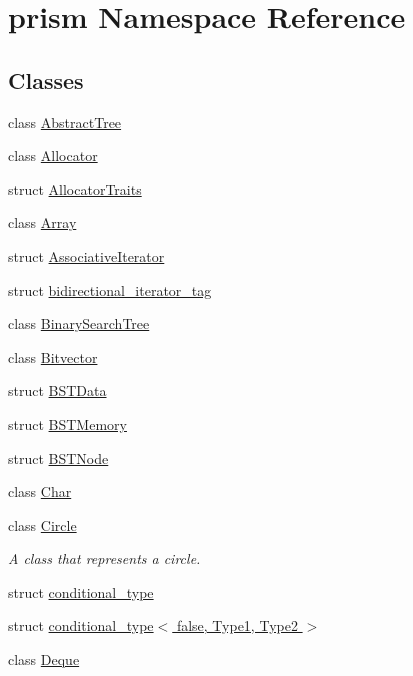 \hypertarget{namespaceprism}{}\section{prism Namespace Reference}
\label{namespaceprism}
\subsection*{Classes}
\begin{DoxyCompactItemize}
\item 
class \hyperlink{classprism_1_1_abstract_tree}{Abstract\+Tree}
\item 
class \hyperlink{classprism_1_1_allocator}{Allocator}
\item 
struct \hyperlink{structprism_1_1_allocator_traits}{Allocator\+Traits}
\item 
class \hyperlink{classprism_1_1_array}{Array}
\item 
struct \hyperlink{structprism_1_1_associative_iterator}{Associative\+Iterator}
\item 
struct \hyperlink{structprism_1_1bidirectional__iterator__tag}{bidirectional\+\_\+iterator\+\_\+tag}
\item 
class \hyperlink{classprism_1_1_binary_search_tree}{Binary\+Search\+Tree}
\item 
class \hyperlink{classprism_1_1_bitvector}{Bitvector}
\item 
struct \hyperlink{structprism_1_1_b_s_t_data}{B\+S\+T\+Data}
\item 
struct \hyperlink{structprism_1_1_b_s_t_memory}{B\+S\+T\+Memory}
\item 
struct \hyperlink{structprism_1_1_b_s_t_node}{B\+S\+T\+Node}
\item 
class \hyperlink{classprism_1_1_char}{Char}
\item 
class \hyperlink{classprism_1_1_circle}{Circle}
\begin{DoxyCompactList}\small\item\em A class that represents a circle. \end{DoxyCompactList}\item 
struct \hyperlink{structprism_1_1conditional__type}{conditional\+\_\+type}
\item 
struct \hyperlink{structprism_1_1conditional__type_3_01false_00_01_type1_00_01_type2_01_4}{conditional\+\_\+type$<$ false, Type1, Type2 $>$}
\item 
class \hyperlink{classprism_1_1_deque}{Deque}
\item 

\end{DoxyCompactItemize}
